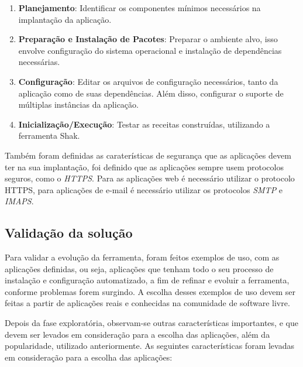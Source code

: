 \begin{enumerate}
  \item  \textbf{Planejamento}: Identificar os componentes mínimos necessários na implantação
 da aplicação.  
  \item  \textbf{Preparação e Instalação de Pacotes}: Preparar o ambiente alvo, 
isso envolve configuração do sistema operacional e instalação de dependências necessárias.
  \item  \textbf{Configuração}: Editar os arquivos de configuração necessários, tanto 
da aplicação como de suas dependências. Além disso, configurar o suporte de múltiplas instâncias
da aplicação.   
  \item  \textbf{Inicialização/Execução}: Testar as receitas construídas, utilizando
a ferramenta Shak. 
\end{enumerate}

Também foram definidas as caraterísticas de segurança que as aplicações devem 
ter na  sua implantação, foi 
definido que as aplicações sempre usem protocolos 
seguros, como o \textit{HTTPS}. 
Para as aplicações web é necessário utilizar o protocolo HTTPS, para aplicações
de e-mail é necessário utilizar os protocolos \textit{SMTP} e \textit{IMAPS}.

\subsection{Validação da solução}
\label{subsection:validacao}

Para validar a evolução da ferramenta, foram feitos exemplos de uso,
com as aplicações definidas, ou seja, aplicações que tenham todo o seu 
processo de instalação e configuração automatizado, a
fim de refinar e evoluir a ferramenta, conforme problemas forem surgindo. A escolha
desses exemplos de uso devem ser feitas a partir de aplicações reais e
conhecidas na comunidade de software livre. 

Depois da fase exploratória, observam-se outras características importantes, e que 
devem ser levados em consideração para a escolha das aplicações, além da 
popularidade, utilizado anteriormente. As seguintes 
características foram levadas em consideração para a escolha das aplicações:

